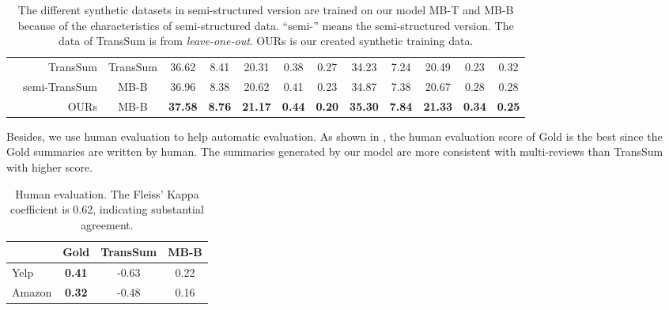 \begin{table*}[th]
\begin{center}
\begin{tabular}{|l|r|c|c|c|c|c|c|c|c|c|c|c|}
			\cline{2-13}
			&TransSum & TransSum & 36.62&8.41 &20.31 &0.38 & 0.27 & 34.23& 7.24 & 20.49 & 0.23 & 0.32\\  
			\cline{2-13}
			&semi-TransSum& MB-B & 36.96& 8.38 & 20.62 & 0.41 & 0.23 & 34.87 & 7.38 &  20.67& 0.28 & 0.28 \\
			\cline{2-13}
			&OURs& MB-B & \bf 37.58 & \bf 8.76 & \bf 21.17 & \bf 0.44 & \bf 0.20 & \bf 35.30 & \bf 7.84 & \bf 21.33 & \bf 0.34 & \bf 0.25 \\ 
			\hline
		\end{tabular}
	\end{center}
	\caption{The different synthetic datasets in semi-structured version
		are trained on our model MB-T and MB-B because of the characteristics of semi-structured data. ``semi-'' means the semi-structured version. The data of TransSum is from {\em leave-one-out}. OURs is our created synthetic training data.}
	\label{tab:traindata}  
\end{table*}


Besides, we use human evaluation
to help automatic evaluation.
As shown in  , 
the human evaluation score of Gold is the best
since the Gold summaries are written by human.
The summaries generated by our model 
are more consistent with multi-reviews than TransSum with higher score.
\begin{table}[th]
	\centering
	\scriptsize
	\begin{tabular}{|l|c|c|c|}
		\hline 
		& Gold & TransSum & MB-B\\
		\hline
		Yelp & \bf{0.41} &  -0.63 & 0.22 \\
		Amazon &\bf{0.32} & -0.48 & 0.16 \\
		\hline
	\end{tabular}
	\caption{Human evaluation. The Fleiss' Kappa coefficient is 0.62, indicating substantial agreement.
	}\label{tab:human}  
\end{table}





